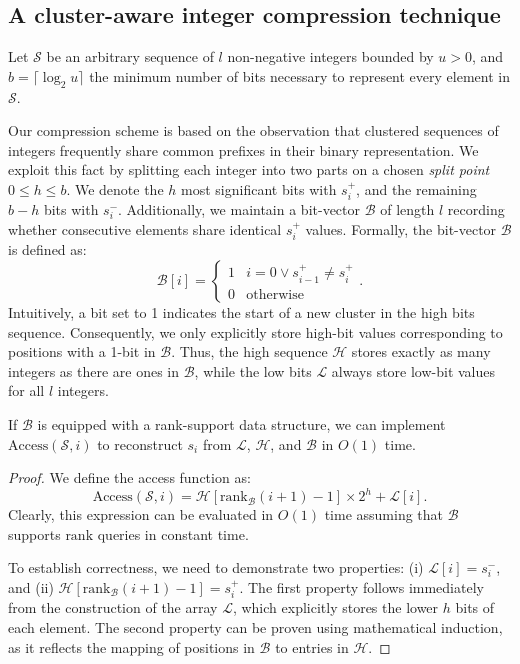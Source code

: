 \subsection{A cluster-aware integer compression technique}
Let $\mathcal S$ be an arbitrary sequence of $l$ non-negative integers bounded by $u > 0$, and  $b = \lceil \log_2 u \rceil$ the minimum number of bits necessary to represent every element in $\mathcal S$.

Our compression scheme is based on the observation that clustered sequences of integers frequently share common prefixes in their binary representation. We exploit this fact by splitting each integer into two parts on a chosen \emph{split point} $0 \le h \le b$. We denote the $h$ most significant bits with \(s_i^+\), and the remaining $b - h$ bits with $s_i^-$. 
Additionally, we maintain a bit-vector $\mathcal{B}$ of length $l$ recording whether consecutive elements share identical $s_i^+$ values. Formally, the bit-vector $\mathcal{B}$ is defined as:
\begin{equation*}
    \mathcal B [i] = \begin{cases}
    1 & i = 0 \lor s_{i - 1}^+ \ne s_{i}^+ \\
    0 & \text{otherwise}
    \end{cases}.
\end{equation*}
Intuitively, a bit set to 1 indicates the start of a new cluster in the high bits sequence. Consequently, we only explicitly store high-bit values corresponding to positions with a 1-bit in $\mathcal B$. Thus, the high sequence $\mathcal H$ stores exactly as many integers as there are ones in $\mathcal{B}$, while the low bits $\mathcal L$ always store low-bit values for all $l$ integers.

\begin{lemma}
If $\mathcal B$ is equipped with a rank-support data structure, we can implement $\text{Access}(\mathcal S, i)$ to reconstruct $s_i$ from $\mathcal L$, $\mathcal H$, and $\mathcal B$ in $O(1)$ time.
\end{lemma}

\begin{proof}
We define the access function as:
\begin{equation*}
    \text{Access}(\mathcal S, i) = \mathcal H[\text{rank}_{\mathcal B}(i + 1) - 1] \times 2^h + \mathcal L[i].
\end{equation*}
Clearly, this expression can be evaluated in $O(1)$ time assuming that $\mathcal B$ supports $\text{rank}$ queries in constant time.

To establish correctness, we need to demonstrate two properties: (i) $\mathcal L[i] = s_i^- $, and (ii) $ \mathcal H[\text{rank}_{\mathcal B}(i+1) -1] = s_i^+ $. The first property follows immediately from the construction of the array $\mathcal  L $, which explicitly stores the lower $ h $ bits of each element. The second property can be proven using mathematical induction, as it reflects the mapping of positions in $ \mathcal B $ to entries in $\mathcal H $.
\end{proof}



